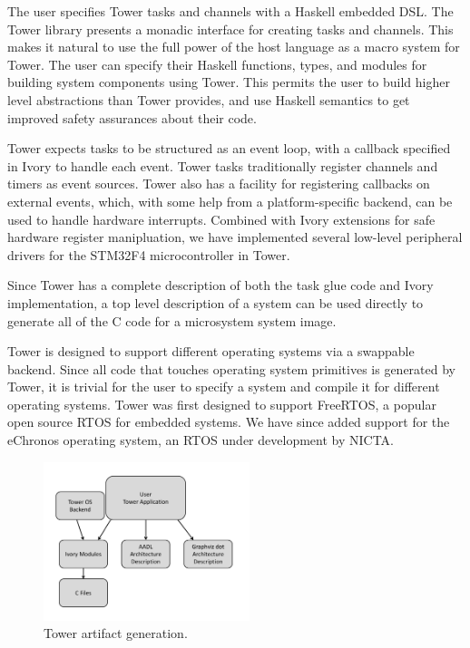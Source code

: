 The user specifies Tower tasks and channels with a Haskell embedded DSL. The
Tower library presents a monadic interface for creating tasks and channels.
This makes it natural to use the full power of the host language as a macro
system for Tower. The user can specify their Haskell functions, types, and
modules for building system components using Tower. This permits the user to
build higher level abstractions than Tower provides, and use Haskell semantics
to get improved safety assurances about their code.

Tower expects tasks to be structured as an event loop, with a callback specified
in Ivory to handle each event. Tower tasks traditionally register channels and
timers as event sources. Tower also has a facility for registering callbacks on
external events, which, with some help from a platform-specific backend, can
be used to handle hardware interrupts. Combined with Ivory extensions for safe
hardware register manipluation, we have implemented several low-level peripheral
drivers for the STM32F4 microcontroller in Tower.

Since Tower has a complete description of both the task glue code and Ivory
implementation, a top level description of a system can be used directly to
generate all of the C code for a microsystem system image.

Tower is designed to support different operating systems via a swappable
backend. Since all code that touches operating system primitives is generated by
Tower, it is trivial for the user to specify a system and compile it for
different operating systems. Tower was first designed to support FreeRTOS, a
popular open source RTOS for embedded systems. We have since added support for
the eChronos operating system, an RTOS under development by NICTA.

\begin{figure}
  \begin{center}
\includegraphics[width=6cm]{figures/tower-artifacts-dia}
  \end{center}
  \caption[Tower artifacts]{Tower artifact generation.}
\label{fig:towerArtifacts}
\end{figure}


